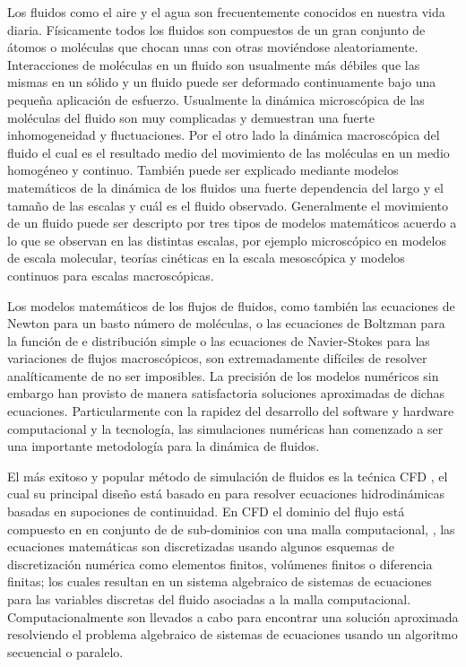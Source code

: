 Los fluidos como el aire y el agua son frecuentemente conocidos en nuestra vida diaria. Físicamente todos los fluidos son compuestos de un gran conjunto de átomos o moléculas que chocan unas con otras moviéndose  aleatoriamente. Interacciones de moléculas en un fluido son usualmente más débiles que las mismas en un sólido y un fluido puede ser deformado continuamente bajo una pequeña aplicación de esfuerzo. Usualmente la dinámica microscópica de las moléculas del fluido son muy complicadas y demuestran una fuerte inhomogeneidad y fluctuaciones. Por el otro lado la dinámica macroscópica del fluido el cual es el resultado medio del movimiento de las moléculas en un medio homogéneo y continuo.  También puede ser explicado mediante modelos matemáticos de la dinámica de los fluidos una fuerte dependencia del largo y el tamaño de las escalas y cuál es el fluido observado. Generalmente el movimiento de un fluido puede ser descripto por tres tipos de modelos matemáticos acuerdo a lo que se observan en las distintas escalas, por ejemplo microscópico en modelos de escala molecular, teorías cinéticas en la escala mesoscópica y modelos continuos para escalas macroscópicas.

Los modelos matemáticos de los flujos de fluidos, como también las ecuaciones de Newton para un basto número de moléculas, o las ecuaciones de Boltzman para la función de e distribución simple o las ecuaciones de Navier-Stokes para las variaciones de flujos macroscópicos, son extremadamente difíciles de resolver analíticamente de no ser imposibles. La precisión de los modelos numéricos sin embargo han provisto de manera satisfactoria soluciones aproximadas de dichas ecuaciones. Particularmente con la rapidez del desarrollo del software y hardware computacional y la tecnología, las simulaciones numéricas han comenzado a ser una importante metodología para la dinámica de fluidos.

El más exitoso y popular método de simulación de fluidos es la tećnica CFD , el cual su principal diseño está basado en  para resolver ecuaciones hidrodinámicas basadas en supociones de continuidad. En CFD el dominio del flujo está compuesto en en conjunto de de sub-dominios con una malla computacional, , las ecuaciones matemáticas son discretizadas usando algunos esquemas de discretización numérica como elementos finitos, volúmenes finitos o diferencia finitas; los cuales resultan en un sistema algebraico de sistemas de ecuaciones para las variables discretas del fluido asociadas a la malla computacional. Computacionalmente son llevados a cabo para encontrar una solución aproximada resolviendo el problema algebraico de sistemas de ecuaciones usando un algoritmo secuencial o paralelo.

